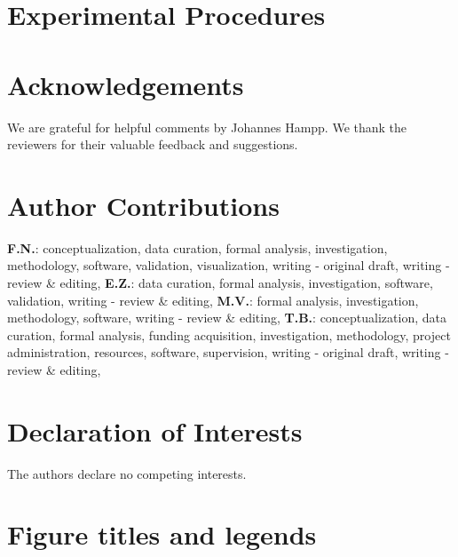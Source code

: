 \documentclass[3p]{elsarticle}
\begin{document}


\section*{Experimental Procedures}
\label{sec:methods}



\section*{Acknowledgements}

We are grateful for helpful comments by Johannes Hampp. We thank the
reviewers for their valuable feedback and suggestions.


\section*{Author Contributions}


\textbf{F.N.}:
conceptualization,
data curation,
formal analysis,
investigation,
methodology,
software,
validation,
visualization,
writing - original draft,
writing - review \& editing,
\textbf{E.Z.}:
data curation,
formal analysis,
investigation,
software,
validation,
writing - review \& editing,
\textbf{M.V.}:
formal analysis,
investigation,
methodology,
software,
writing - review \& editing,
\textbf{T.B.}:
conceptualization,
data curation,
formal analysis,
funding acquisition,
investigation,
methodology,
project administration,
resources,
software,
supervision,
writing - original draft,
writing - review \& editing,

\section*{Declaration of Interests}

The authors declare no competing interests.

% 


\section*{Figure titles and legends}


\end{document}
